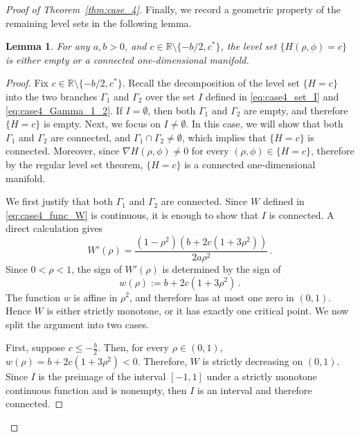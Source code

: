 \documentclass[10pt]{article}
\newtheorem{lemma}[theorem]{Lemma}
\theoremstyle{definition}
\theoremstyle{definition}
\numberwithin{equation}{section}
\newcommand{\R}{\mathbb{R}}
\begin{document}
\begin{proof}[Proof of Theorem~\ref{thm:case_4}]
Finally, we record a geometric property of the remaining level sets in the following lemma.

\begin{lemma}\label{lem:case4_H_level_set}
For any $a, b >0$, and $c \in \R \setminus \{-b/2, c^*\}$, the level set $\{H(\rho, \phi) = c\}$ is either empty or a connected one-dimensional manifold.
\end{lemma}

\begin{proof}
Fix $c \in \R \setminus \{-b/2, c^*\}$.
Recall the decomposition of the level set $\{H=c\}$ into the two branches $\Gamma_1$ and $\Gamma_2$ over the set $I$ defined in \eqref{eq:case4_set_I} and \eqref{eq:case4_Gamma_1_2}. 
If $I = \emptyset$, then both $\Gamma_1$ and $\Gamma_2$ are empty, and therefore $\{H=c\}$ is empty.
Next, we focus on $I \neq \emptyset$.
In this case, we will show that both $\Gamma_1$ and $\Gamma_2$ are connected, and $\Gamma_1 \cap \Gamma_2 \neq \emptyset$, which implies that $\{H=c\}$ is connected.
Moreover, since $\nabla H(\rho, \phi) \neq 0$ for every $(\rho, \phi) \in \{H = c\}$, therefore by the regular level set theorem, $\{H=c\}$ is a connected one-dimensional manifold.

We first justify that both $\Gamma_1$ and $\Gamma_2$ are connected.
Since $W$ defined in \eqref{eq:case4_func_W} is continuous, it is enough to show that $I$ is connected.
A direct calculation gives
\[W'(\rho) = \frac{(1-\rho^2)(b + 2c(1 + 3\rho^2))}{2a\rho^2} \, .\]
Since $0 < \rho < 1$, the sign of $W'(\rho)$ is determined by the sign of 
\begin{equation}\label{eq:case4_small_w}
w(\rho) := b + 2c(1 + 3\rho^2) \, .
\end{equation}
The function $w$ is affine in $\rho^2$, and therefore has at most one zero in $(0,1)$.  
Hence $W$ is either strictly monotone, or it has exactly one critical point.
We now split the argument into two cases.

First, suppose $c \leq -\frac{b}{2}$.
Then, for every $\rho \in (0,1)$, $w(\rho) = b + 2c(1 + 3\rho^2) < 0$.
Therefore, $W$ is strictly decreasing on $(0,1)$.
Since $I$ is the preimage of the interval $[-1, 1]$ under a strictly monotone continuous function and is nonempty, then $I$ is an interval and therefore connected.


\end{proof}
\end{proof}
\end{document}
